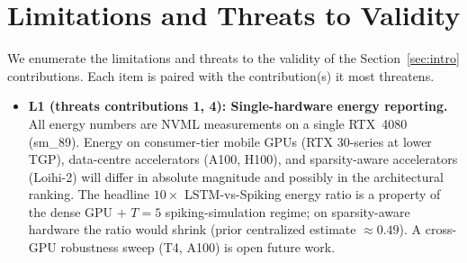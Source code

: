 \documentclass[journal]{IEEEtran}
\begin{document}
\section{Limitations and Threats to Validity}\label{sec:limits}

We enumerate the limitations and threats to the validity of the Section~\ref{sec:intro} contributions. Each item is paired with the contribution(s) it most threatens.

\begin{itemize}
  \item \textbf{L1 (threats contributions 1, 4): Single-hardware energy reporting.} All energy numbers are NVML measurements on a single RTX~4080 (sm\_89). Energy on consumer-tier mobile GPUs (RTX 30-series at lower TGP), data-centre accelerators (A100, H100), and sparsity-aware accelerators (Loihi-2) will differ in absolute magnitude and possibly in the architectural ranking. The headline $10\times$ LSTM-vs-Spiking energy ratio is a property of the dense GPU $+$ $T = 5$ spiking-simulation regime; on sparsity-aware hardware the ratio would shrink (prior centralized estimate $\approx 0.49$). A cross-GPU robustness sweep (T4, A100) is open future work.


\end{itemize}
\end{document}
